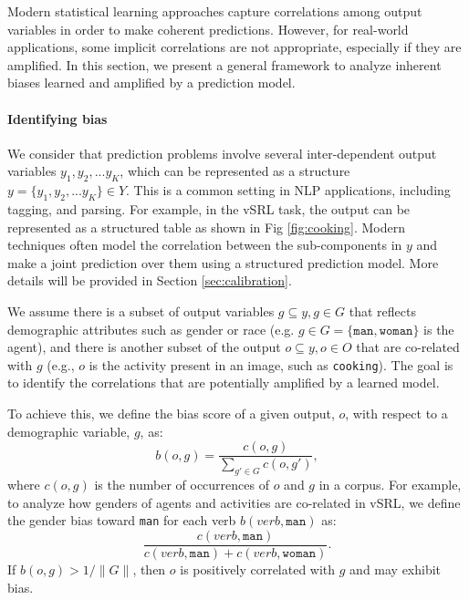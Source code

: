 Modern statistical learning approaches capture %
correlations among output variables in order to make coherent predictions. 
However, for real-world applications, some implicit correlations are not appropriate, especially if they are amplified. 
In this section, we present a general framework to analyze inherent biases learned and amplified by a prediction model. 

\paragraph{Identifying bias}
We consider that prediction problems involve several inter-dependent output variables $y_1, y_2, ... y_K$, which can be represented as a structure $y = \{y_1, y_2, ... y_K\} \in Y$. This is a common setting in NLP applications, including tagging, and parsing. For example, in the vSRL task, the output can be represented as a structured table as shown in  Fig \ref{fig:cooking}. Modern techniques often model the correlation between the sub-components in $y$ and make a joint prediction over them using a structured prediction model. More details will be provided in Section \ref{sec:calibration}.

We assume there is a subset of output variables $g\subseteq y, g\in G$ 
that reflects demographic attributes such as gender or race (e.g. 
$g\in G=\{\texttt{man}, \texttt{woman}\}$ is the agent), and there is another subset of the output 
$o\subseteq y, o\in O$ that are co-related with $g$ (e.g., $o$ is the activity present in an image, such as \texttt{cooking}). The goal is to identify the correlations that 
are potentially amplified by a learned model.

To achieve this, we define the bias score of a given output, $o$, with respect to a demographic variable, $g$, as:
$$	b(o,g) = \frac{c(o, g)}{\sum_{g'\in G}c(o, g')},$$
where $c(o,g)$ is the number of occurrences of $o$ and $g$ in a 
corpus.   
For example, to analyze how genders of agents and activities are co-related in 
vSRL, we define the gender bias toward \texttt{man} for each verb $b(verb, \texttt{man})$ as:
\begin{equation}
	 \frac{c(verb, \texttt{man})}{c(verb, \texttt{man}) + c(verb, \texttt{woman})}.
    \label{eq:gender_ratio}
\end{equation}
If $b(o,g) > 1/\|G\|$,  then $o$ is positively correlated with $g$ and may exhibit bias. 
